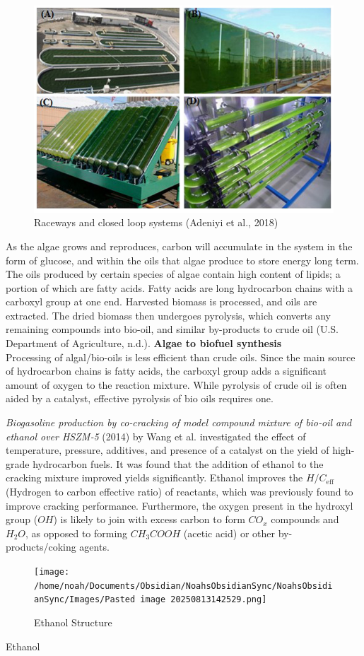 \documentclass[10pt,a4paper]{article}
\begin{document}
	\begin{figure}[h]
		\centering
		\includegraphics[width=0.7\linewidth]{LaTeX/raceways}
		\caption{Raceways and closed loop systems (Adeniyi et al., 2018)}
		\label{fig:raceways}
	\end{figure}
	


	As the algae grows and reproduces, carbon will accumulate in the system
	in the form of glucose, and within the oils that algae produce to store
	energy long term. The oils produced by certain species of algae contain
	high content of lipids; a portion of which are fatty acids. Fatty acids
	are long hydrocarbon chains with a carboxyl group at one end.
	Harvested biomass is processed, and oils are extracted. The dried
	biomass then undergoes pyrolysis, which converts any remaining compounds
	into bio-oil, and similar by-products to crude oil (U.S. Department of
	Agriculture, n.d.). 
	\newpage
	\textbf{Algae to biofuel synthesis}\\
	Processing of algal/bio-oils is less efficient than crude oils. Since
	the main source of hydrocarbon chains is fatty acids, the carboxyl group
	adds a significant amount of oxygen to the reaction mixture. While
	pyrolysis of crude oil is often aided by a catalyst, effective pyrolysis
	of bio oils requires one.
	
	\textit{Biogasoline production by co‐cracking of model compound mixture of bio‐oil and ethanol over HSZM‐5} (2014) by Wang et al.  investigated the effect of temperature, pressure, additives, and
	presence of a catalyst on the yield of high-grade hydrocarbon fuels. It
	was found that the addition of ethanol to the cracking mixture improved
	yields significantly. Ethanol improves the $H/C_\textrm{eff}$ (Hydrogen to carbon
	effective ratio) of reactants, which was previously found to improve
	cracking performance. Furthermore, the oxygen present in the hydroxyl
	group ($OH$) is likely to join with excess carbon to form $CO_x$ compounds and
	$H_2O$, as opposed to forming $CH_3COOH$ (acetic acid) or other
	by-products/coking agents. 
	\begin{figure}
	\centering
	\texttt{[image: /home/noah/Documents/Obsidian/NoahsObsidianSync/NoahsObsidianSync/Images/Pasted image 20250813142529.png]}\\
	\caption{Ethanol Structure}
	\end{figure}
	Ethanol
	
\end{document}
